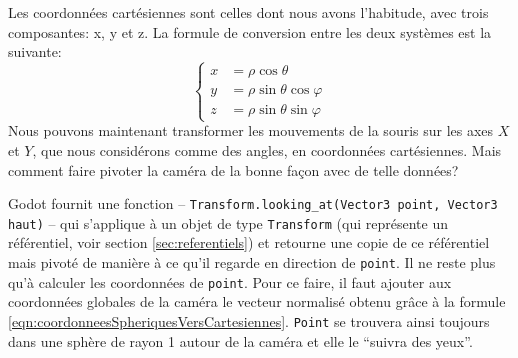Les coordonnées cartésiennes sont celles dont nous avons l'habitude, avec trois composantes: x, y et z. La formule de conversion entre les deux systèmes est la suivante:
\begin{equation}
	\left\{
	\begin{array}{ll}
		x &= \rho \cos \theta\\
		y &= \rho \sin \theta \cos \varphi\\
		z &= \rho \sin \theta \sin \varphi
	\end{array}	
	\right.
	\label{eqn:coordonneesSpheriquesVersCartesiennes}
\end{equation}
Nous pouvons maintenant transformer les mouvements de la souris sur les axes $X$ et $Y$, que nous considérons comme des angles, en coordonnées cartésiennes. Mais comment faire pivoter la caméra de la bonne façon avec de telle données?

Godot fournit une fonction -- \lstinline{Transform.looking_at(Vector3 point, Vector3 haut)} -- qui s'applique à un objet de type \lstinline{Transform} (qui représente un référentiel, voir section \ref{sec:referentiels}) et retourne une copie de ce référentiel mais pivoté de manière à ce qu'il regarde en direction de \lstinline{point}. Il ne reste plus qu'à calculer les coordonnées de \lstinline{point}. Pour ce faire, il faut ajouter aux coordonnées globales de la caméra le vecteur normalisé obtenu grâce à la formule \ref{eqn:coordonneesSpheriquesVersCartesiennes}. \lstinline{Point} se trouvera ainsi toujours dans une sphère de rayon 1 autour de la caméra et elle le \enquote{suivra des yeux}.


